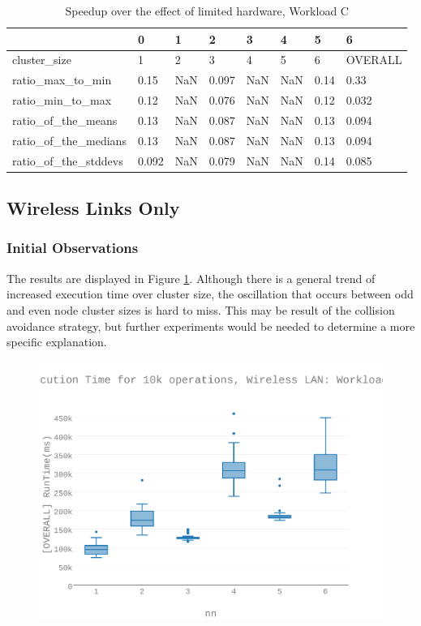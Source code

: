 \begin{table}[H]
\centering
\begin{tabular}{llllllll}
\toprule
{} &     0 &    1 &     2 &    3 &    4 &    5 &        6 \\
\midrule
cluster\_size         &     1 &    2 &     3 &    4 &    5 &    6 &  OVERALL \\
ratio\_max\_to\_min     &  0.15 &  NaN & 0.097 &  NaN &  NaN & 0.14 &     0.33 \\
ratio\_min\_to\_max     &  0.12 &  NaN & 0.076 &  NaN &  NaN & 0.12 &    0.032 \\
ratio\_of\_the\_means   &  0.13 &  NaN & 0.087 &  NaN &  NaN & 0.13 &    0.094 \\
ratio\_of\_the\_medians &  0.13 &  NaN & 0.087 &  NaN &  NaN & 0.13 &    0.094 \\
ratio\_of\_the\_stddevs & 0.092 &  NaN & 0.079 &  NaN &  NaN & 0.14 &    0.085 \\
\bottomrule
\end{tabular}
\caption{Speedup over the effect of limited hardware, Workload C}
\label{table:rp_v_vm_c_speedup}
\end{table}





\subsection{Wireless Links Only}
\subsubsection{Initial Observations}
The results are displayed in Figure \ref{figures-wlc_fig8}.  Although there is a general trend of increased execution time over cluster size, the oscillation that occurs between odd and even node cluster sizes is hard to miss. This may be result of the collision avoidance strategy, but further experiments would be needed to determine a more specific explanation. \begin{figure}[h]
\includegraphics[width=5.5in]{Figures/figures-wlc_fig8.pdf}
\caption{}
\label{figures-wlc_fig8}
\end{figure}




